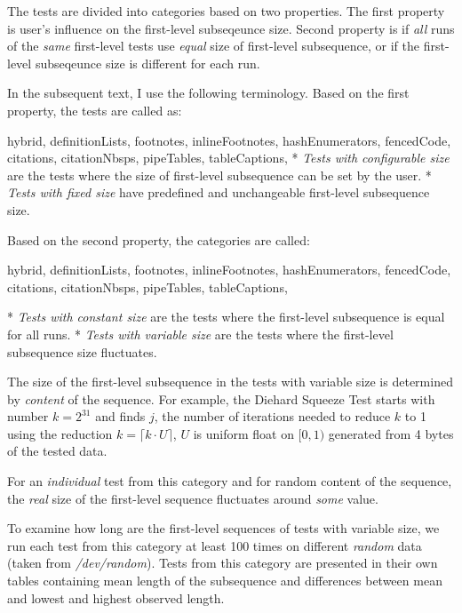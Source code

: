 \documentclass[
  digital,     %
  oneside,     %
  nosansbold,  %
  nocolorbold, %
  nolof,         %
  nolot,         %
]{fithesis4}
\begin{document}
The tests are divided into categories based on two properties. The first property is user's influence on the first-level subseqeunce size. Second property is if \emph{all} runs of the \emph{same} first-level tests use \emph{equal} size of first-level subsequence, or if the first-level subseqeunce size is different for each run. 

In the subsequent text, I use the following terminology. Based on the first property, the tests are called as:
\begin{markdown*}{%
  hybrid,
  definitionLists,
  footnotes,
  inlineFootnotes,
  hashEnumerators,
  fencedCode,
  citations,
  citationNbsps,
  pipeTables,
  tableCaptions,
}
* \emph{Tests with configurable size} are the tests where the size of first-level subsequence can be set by the user.
* \emph{Tests with fixed size} have predefined and unchangeable first-level subsequence size.
\end{markdown*}
Based on the second property, the categories are called:
\begin{markdown*}{%
  hybrid,
  definitionLists,
  footnotes,
  inlineFootnotes,
  hashEnumerators,
  fencedCode,
  citations,
  citationNbsps,
  pipeTables,
  tableCaptions,
}

* \emph{Tests with constant size} are the tests where the first-level subsequence is equal for all runs.
* \emph{Tests with variable size} are the tests where the first-level subsequence size fluctuates.

\end{markdown*}

The size of the first-level subsequence in the tests with variable size is determined by \emph{content} of the sequence. 
For example, the Diehard Squeeze Test starts with number $k=2^{31}$ and finds $j$, the number of iterations needed to reduce $k$ to 1 using the reduction $k=\lceil k\cdot U \rceil $, $U$ is uniform float on $[0,1)$ generated from 4 bytes of the tested data.

For an \emph{individual} test from this category and for random content of the sequence, the \emph{real} size of the first-level sequence fluctuates around \emph{some} value. 

To examine how long are the first-level sequences of tests with variable size, we run each test from this category at least 100 times on different \emph{random} data (taken from \emph{/dev/random}). Tests from this category are presented in their own tables containing mean length of the subsequence and differences between mean and lowest and highest observed length.
\end{document}
